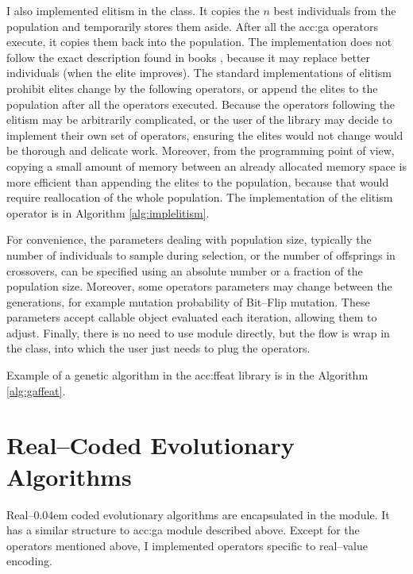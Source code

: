 I also implemented elitism in the  class. It copies the $n$ best individuals from the population and temporarily stores them aside. After all the \acrshort{acc:ga} operators execute, it copies them back into the population. The implementation does not follow the exact description found in books \citep{IntroductionToEA}, because it may replace better individuals (when the elite improves). The standard implementations of elitism prohibit elites change by the following operators, or append the elites to the population after all the operators executed. 
Because the operators following the elitism may be arbitrarily complicated, or the user of the library may decide to implement their own set of operators, ensuring the elites would not change would be thorough and delicate work.
Moreover, from the \gpu programming point of view, copying a small amount of memory between an already allocated memory space is more efficient than appending the elites to the population, because that would require reallocation of the whole population. The implementation of the elitism operator is in Algorithm \ref{alg:implelitism}.

For convenience, the parameters dealing with population size, typically the number of individuals to sample during selection, or the number of offsprings in crossovers, can be specified using an absolute number or a fraction of the population size. Moreover, some operators parameters may change between the generations, for example mutation probability of Bit--Flip mutation. These parameters accept callable object evaluated each iteration, allowing them to adjust. Finally, there is no need to use  module directly, but the flow is wrap in the  class, into which the user just needs to plug the operators.

Example of a genetic algorithm in the \acrshort{acc:ffeat} library is in the Algorithm \ref{alg:gaffeat}.



\section{Real--Coded Evolutionary Algorithms}

Real--\kern0.04em coded evolutionary algorithms are encapsulated in the  module. It has a similar structure to \acrshort{acc:ga} module described above. Except for the operators mentioned above, I implemented operators specific to real--value encoding.

